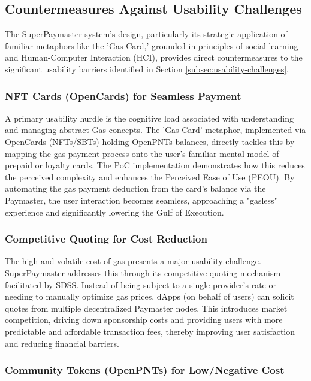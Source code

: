 \documentclass[preprint,12pt]{elsarticle}
\begin{document}
\subsection{Countermeasures Against Usability Challenges}
\label{subsec:usability-countermeasures}

The SuperPaymaster system's design, particularly its strategic application of familiar metaphors like the 'Gas Card,' grounded in principles of social learning and Human-Computer Interaction (HCI)\cite{bandura1977,shneiderman2010,krug2009}, provides direct countermeasures to the significant usability barriers identified in Section \ref{subsec:usability-challenges}.

\subsubsection{NFT Cards (OpenCards) for Seamless Payment}

A primary usability hurdle is the cognitive load associated with understanding and managing abstract Gas concepts. The 'Gas Card' metaphor, implemented via OpenCards (NFTs/SBTs) holding OpenPNTs balances, directly tackles this by mapping the gas payment process onto the user's familiar mental model of prepaid or loyalty cards. The PoC implementation demonstrates how this reduces the perceived complexity and enhances the Perceived Ease of Use (PEOU). By automating the gas payment deduction from the card's balance via the Paymaster, the user interaction becomes seamless, approaching a "gasless" experience and significantly lowering the Gulf of Execution.

\subsubsection{Competitive Quoting for Cost Reduction}

The high and volatile cost of gas presents a major usability challenge. SuperPaymaster addresses this through its competitive quoting mechanism facilitated by SDSS. Instead of being subject to a single provider's rate or needing to manually optimize gas prices, dApps (on behalf of users) can solicit quotes from multiple decentralized Paymaster nodes. This introduces market competition, driving down sponsorship costs and providing users with more predictable and affordable transaction fees, thereby improving user satisfaction and reducing financial barriers.

\subsubsection{Community Tokens (OpenPNTs) for Low/Negative Cost}
\end{document}
